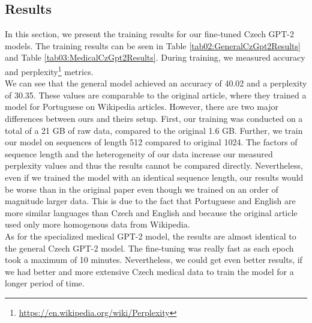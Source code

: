 \subsection{Results}
In this section, we present the training results for our fine-tuned Czech GPT-2 models. The training results can be seen in Table \ref{tab02:GeneralCzGpt2Results} and Table \ref{tab03:MedicalCzGpt2Results}. During training, we measured accuracy and perplexity\footnote[7]{\url{https://en.wikipedia.org/wiki/Perplexity}} metrics.\\

We can see that the general model achieved an accuracy of 40.02 and a perplexity of 30.35. These values are comparable to the original article\citep{guillou2020faster}, where they trained a model for Portuguese on Wikipedia articles. However, there are two major differences between ours and theirs setup. First, our training was conducted on a total of a 21 GB of raw data, compared to the original 1.6 GB. Further, we train our model on sequences of length 512 compared to original 1024. The factors of sequence length and the heterogeneity of our data increase our measured perplexity values and thus the results cannot be compared directly. Nevertheless, even if we trained the model with an identical sequence length, our results would be worse than in the original paper even though we trained on an order of magnitude larger data. This is due to the fact that Portuguese and English are more similar languages than Czech and English and because the original article used only more homogenous data from Wikipedia.\\

As for the specialized medical GPT-2 model, the results are almost identical to the general Czech GPT-2 model. The fine-tuning was really fast as each epoch took  a maximum of 10 minutes. Nevertheless, we could get even better results, if we had better and more extensive Czech medical data to train the model for a longer period of time.

